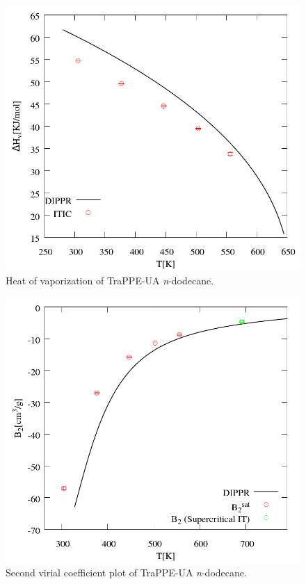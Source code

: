 \documentclass[%
 aip,
 jcp,
 sd,%
 amsmath,amssymb,
]{revtex4-1}
\begin{document}
\begin{figure}[!htbp]
\includegraphics[scale=0.35]{Figures/EXAMPLE-SIM_TraPPE-C12_hvap.png}
\caption{Heat of vaporization of TraPPE-UA \textit{n}-dodecane.}
\label{fig:EXAMPLE-SIM/TraPPE-C12/hvap}
\end{figure}

\begin{figure}[!htbp]
\includegraphics[scale=0.35]{Figures/EXAMPLE-SIM_TraPPE-C12_b2.png}
\caption{Second virial coefficient plot of TraPPE-UA \textit{n}-dodecane.}
\label{fig:EXAMPLE-SIM/TraPPE-C12/b2}
\end{figure}
\end{document}
